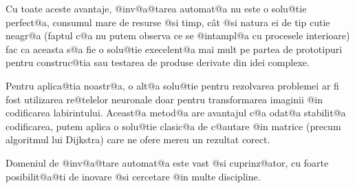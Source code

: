 Cu toate aceste avantaje, @inv@a@tarea automat@a nu este o solu@tie perfect@a, consumul mare de resurse @si timp, c\^ at @si natura ei de tip cutie neagr@a (faptul c@a nu putem observa ce se @intampl@a cu procesele interioare) fac ca aceasta s@a fie o solu@tie execelent@a mai mult pe partea de prototipuri pentru construc@tia sau testarea de produse derivate din idei complexe. 

Pentru aplica@tia noastr@a, o alt@a solu@tie pentru rezolvarea problemei ar fi fost utilizarea re@telelor neuronale doar pentru transformarea imaginii @in codificarea labirintului. Aceast@a metod@a are avantajul c@a odat@a stabilit@a codificarea, putem aplica o solu@tie clasic@a de c@autare @in matrice (precum algoritmul lui Dijkstra) care ne ofere mereu un rezultat corect. 

Domeniul de @inv@a@tare automat@a este vast @si cuprinz@ator, cu foarte posibilit@a@ti de inovare @si cercetare @in multe discipline.
